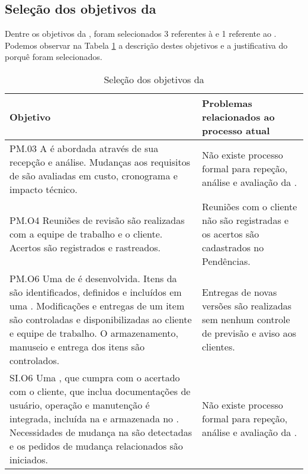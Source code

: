 \subsection{Seleção dos objetivos da \iso}
\label{Sec:estr:obj:iso}

Dentre os objetivos da \iso, foram selecionados 3 referentes à \gp e 1 referente ao \dsw. Podemos observar na Tabela \ref{Tab:estrat:obj:iso} a descrição destes objetivos e a justificativa do porquê foram selecionados.

\begin{table}[h!]\footnotesize
\centering
\begin{tabular}
{
 	|p{7cm}
 	|p{7cm}|
}

\hline

	\textbf{Objetivo \iso}&
	\textbf{Problemas relacionados ao processo atual}\\
	\hline
	
	PM.03 A \muda é abordada através de sua recepção e análise. Mudanças aos requisitos de \sw são avaliadas em custo, cronograma e impacto técnico.&
	Não existe processo formal para repeção, análise e avaliação da \muda.\\
	\hline
	
	PM.O4 Reuniões de revisão são realizadas com a equipe de trabalho e o cliente. Acertos são registrados e rastreados.&
	Reuniões com o cliente não são registradas e os acertos são cadastrados no \sw Pendências.\\
	\hline
	
	PM.O6 Uma \vcs de \sw é desenvolvida. Itens da \swcfg são identificados, definidos e incluídos em uma \bline. Modificações e entregas de um item são controladas e disponibilizadas ao cliente e equipe de trabalho. O armazenamento, manuseio e entrega dos itens são controlados.&
	Entregas de novas versões são realizadas sem nenhum controle de previsão e aviso aos clientes.\\
	\hline
	
	SI.O6 Uma \swcfg, que cumpra com o \req acertado com o cliente, que inclua documentações de usuário, operação e manutenção é integrada, incluída na \bline e armazenada no \rep. Necessidades de mudança na \swcfg são detectadas e os pedidos de mudança relacionados são iniciados.&
	Não existe processo formal para repeção, análise e avaliação da \muda.\\
	\hline

\end{tabular}
\caption{Seleção dos objetivos da \iso}
\label{Tab:estrat:obj:iso}
\end{table}

